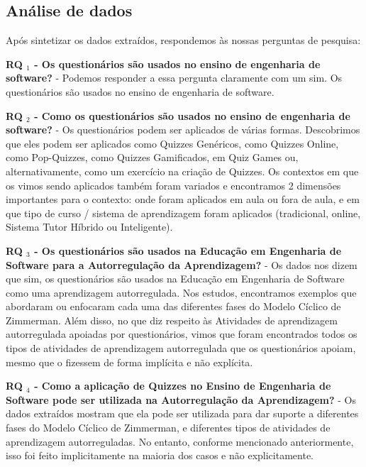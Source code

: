 \subsection{Análise de dados}

Após sintetizar os dados extraídos, respondemos às nossas perguntas de pesquisa:

\textbf{RQ $ _1 $ - Os questionários são usados no ensino de engenharia de software?} -
Podemos responder a essa pergunta claramente com um sim. Os questionários são usados no ensino de engenharia de software.

\textbf{RQ $ _2 $ - Como os questionários são usados no ensino de engenharia de software?} -
Os questionários podem ser aplicados de várias formas. Descobrimos que eles podem ser aplicados como Quizzes Genéricos, como Quizzes Online, como Pop-Quizzes, como Quizzes Gamificados, em Quiz Games ou, alternativamente, como um exercício na criação de Quizzes. Os contextos em que os vimos sendo aplicados também foram variados e encontramos 2 dimensões importantes para o contexto: onde foram aplicados em aula ou fora de aula, e em que tipo de curso / sistema de aprendizagem foram aplicados (tradicional, online, Sistema Tutor Híbrido ou Inteligente).

\textbf{RQ $ _3 $ - Os questionários são usados na Educação em Engenharia de Software para a Autorregulação da Aprendizagem?} - Os dados nos dizem que sim, os questionários são usados na Educação em Engenharia de Software como uma aprendizagem autorregulada. Nos estudos, encontramos exemplos que abordaram ou enfocaram cada uma das diferentes fases do Modelo Cíclico de Zimmerman. Além disso, no que diz respeito às Atividades de aprendizagem autorregulada apoiadas por questionários, vimos que foram encontrados todos os tipos de atividades de aprendizagem autorregulada que os questionários apoiam, mesmo que o fizessem de forma implícita e não explícita.

\textbf{RQ $ _4 $ - Como a aplicação de Quizzes no Ensino de Engenharia de Software pode ser utilizada na Autorregulação da Aprendizagem?} - Os dados extraídos mostram que ela pode ser utilizada para dar suporte a diferentes fases do Modelo Cíclico de Zimmerman, e diferentes tipos de atividades de aprendizagem autorreguladas. No entanto, conforme mencionado anteriormente, isso foi feito implicitamente na maioria dos casos e não explicitamente.

